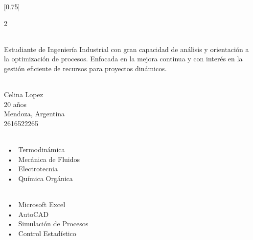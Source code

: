 \documentclass[lighthipster]{simplehipstercv}
\begin{document}
\setlength{\columnsep}{1.5cm}
[0.75]
\begin{paracol}{2}

\paracolbackgroundoptions



\footnotesize
{\setasidefontcolour
\flushright
\begin{center}
\end{center}

\\[0.5em]
Estudiante de Ingeniería Industrial con gran capacidad de análisis y orientación a la optimización de procesos. Enfocada en la mejora continua y con interés en la gestión eficiente de recursos para proyectos dinámicos.

{\footnotesize}
\bigskip

 \\[0.5em]
Celina Lopez \\
20 años  \\
Mendoza, Argentina \\ 
2616522265 \\

\bigskip

 \\[0.5em]

 ~•~ Termodinámica \\
 ~•~ Mecánica de Fluidos \\
 ~•~ Electrotecnia \\
 ~•~ Química Orgánica \\
 
\bigskip


\\[0.5em]


~•~ Microsoft Excel  \\
~•~ AutoCAD \\ 
~•~ Simulación de Procesos \\
~•~ Control Estadístico \\



\vspace{4em}



}
\end{paracol}
\end{document}
